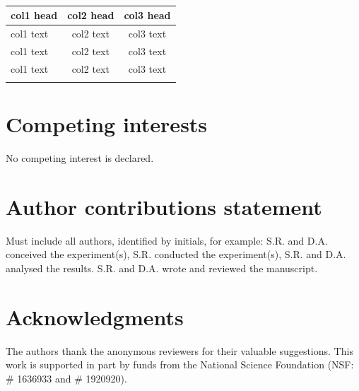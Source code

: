 \documentclass[unnumsec,webpdf,modern,large]{mam-authoring-template}%
\theoremstyle{thmstyleone}%
\theoremstyle{thmstyletwo}%
\theoremstyle{thmstylethree}%
\begin{document}
\begin{appendices}
\begin{table}
\begin{center}
\begin{minipage}{.52\columnwidth}
\caption{}{%
\begin{tabular}{lcc}%
\toprule
col1 head & col2 head & col3 head \\
\midrule
col1 text & col2 text & col3 text \\
col1 text & col2 text & col3 text \\
col1 text & col2 text & col3 text \\
\botrule
\end{tabular}}{}
\end{minipage}
\end{center}
\end{table}

\end{appendices}

\section{Competing interests}
No competing interest is declared.

\section{Author contributions statement}

Must include all authors, identified by initials, for example:
S.R. and D.A. conceived the experiment(s),  S.R. conducted the experiment(s), S.R. and D.A. analysed the results.  S.R. and D.A. wrote and reviewed the manuscript.

\section{Acknowledgments}
The authors thank the anonymous reviewers for their valuable suggestions. This work is supported in part by funds from the National Science Foundation (NSF: \# 1636933 and \# 1920920).



\end{document}
